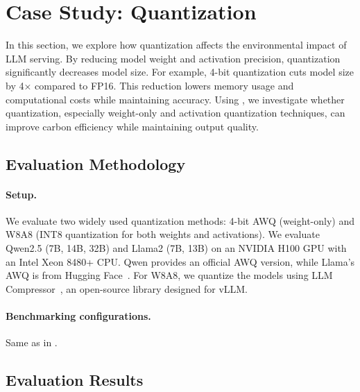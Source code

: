 \section{Case Study: Quantization}\label{sec:case2} 

In this section, we explore how quantization affects the environmental impact of LLM serving. By reducing model weight and activation precision, quantization significantly decreases model size. For example, 4-bit quantization cuts model size by 4× compared to FP16. This reduction lowers memory usage and computational costs while maintaining accuracy. Using \SYSTEM{}, we investigate whether quantization, especially weight-only \cite{lin2024awq} and activation \cite{frantar2022gptq} quantization techniques, can improve carbon efficiency while maintaining output quality.

\subsection{Evaluation Methodology}

\paragraph{Setup.} We evaluate two widely used quantization methods: 4-bit AWQ \cite{lin2024awq} (weight-only) and W8A8 \cite{frantar2022gptq} (INT8 quantization for both weights and activations). We evaluate Qwen2.5 (7B, 14B, 32B) and Llama2 (7B, 13B) on an NVIDIA H100 GPU with an Intel Xeon 8480+ CPU. Qwen provides an official AWQ version, while Llama’s AWQ is from Hugging Face~\cite{huggingface_llama7_awq_2023, huggingface_llama13_awq_2023}. For W8A8, we quantize the models using LLM Compressor~\cite{vllm_llm_compressor_2023}, an open-source library designed for vLLM.


\paragraph{Benchmarking configurations.} Same as in .

\subsection{Evaluation Results}


